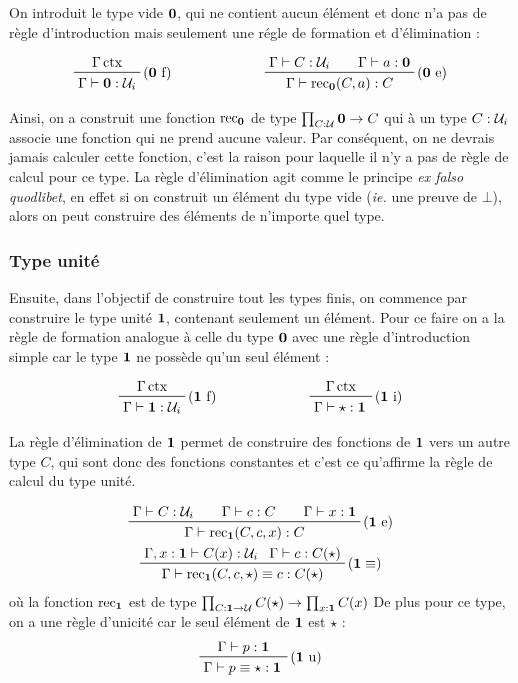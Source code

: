 \documentclass[../../rapport.tex]{subfiles}
\begin{document}
  On introduit le type vide $\operatorname{\textbf{0}}$, qui ne contient aucun élément et donc n'a pas de règle d'introduction mais seulement
  une régle de formation et d'élimination :

  $$
  \prfinterspace=2em
  \begin{array}{cc}
    \prftree[r]{($\0$ f)}{\Gamma \ctx}{\Gamma \vdash \0 : \U_i} \hspace{2cm}
    & \prftree[r]{($\0$ e)}{\Gamma \vdash C : \U_i}{\Gamma \vdash a : \0}{\Gamma \vdash \rec_{\0}(C, a) : C}
  \end{array}
  $$

  Ainsi, on a construit une fonction $\operatorname{rec}_{\operatorname{\textbf{0}}}$ de type $\prod_{C: \mathcal U} \operatorname{\textbf{0}} \rightarrow C$
  qui à un type $C : \mathcal U_i$ associe une fonction qui ne prend aucune valeur.
  Par conséquent, on ne devrais jamais calculer cette fonction,
  c'est la raison pour laquelle il n'y a pas de règle de calcul pour ce type.
  La règle d'élimination agit comme le principe \textit{ex falso quodlibet},
  en effet si on construit un élément du type vide (\textit{ie.} une preuve de $\bot$),
  alors on peut construire des éléments de n'importe quel type.

  \subsubsection{Type unité}

  Ensuite, dans l'objectif de construire tout les types finis, on commence par construire le type unité $\operatorname{\textbf{1}}$,
  contenant seulement un élément. Pour ce faire on a la règle de formation analogue à celle du type $\operatorname{\textbf{0}}$ avec
  une règle d'introduction simple car le type $\operatorname{\textbf{1}}$ ne possède qu'un seul élément :

  $$
  \prfinterspace=2em
  \begin{array}{cc}
    \prftree[r]{($\1$ f)}{\Gamma \ctx}{\Gamma \vdash \1 : \U_i} \hspace{2cm}
    & \prftree[r]{($\1$ i)}{\Gamma \ctx}{\Gamma \vdash \star : \1}
  \end{array}
  $$

  La règle d'élimination de $\operatorname{\textbf{1}}$ permet de construire des fonctions de $\operatorname{\textbf{1}}$ vers un autre type $C$,
  qui sont donc des fonctions constantes et c'est ce qu'affirme la règle de calcul du type unité.

  \begin{gather*}
    \prfinterspace=2em
    \prftree[r]{($\1$ e)}{\Gamma \vdash C : \U_i}{\Gamma \vdash c : C}{\Gamma \vdash x : \1}
      {\Gamma \vdash \rec_{\1}(C, c, x) : C} \\
    \prftree[r]{($\1 \equiv$)}
      {\Gamma, x : \1 \vdash C(x) : \U_i}{\Gamma \vdash c : C(\star)}
    {\Gamma \vdash \rec_{\1}(C, c, \star) \equiv c : C(\star)}
  \end{gather*}
  où la fonction $\operatorname{rec}_{\operatorname{\textbf{1}}}$ est de type $\prod_{C : \operatorname{\textbf{1}} \rightarrow \mathcal U} C(\star) \rightarrow \prod_{x:\operatorname{\textbf{1}}} C(x)$
  De plus pour ce type, on a une règle d'unicité car le seul élément de $\operatorname{\textbf{1}}$ est $\star$ :
  $$
  \prfinterspace=2em
  \prftree[r]{($\1$ u)}
    {\Gamma \vdash p : \1}
    {\Gamma \vdash p \equiv \star : \1}
  $$
\end{document}

